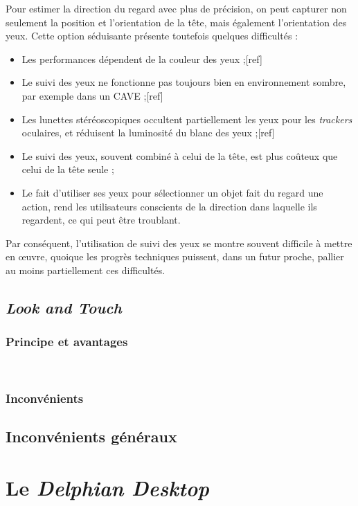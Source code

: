 	Pour estimer la direction du regard avec plus de précision, on peut capturer non seulement la position et l'orientation de la tête, mais également l'orientation des yeux. Cette option séduisante présente toutefois quelques difficultés :
	\begin{itemize}
		\item Les performances dépendent de la couleur des yeux ;[ref]
		\item Le suivi des yeux ne fonctionne pas toujours bien en environnement sombre, par exemple dans un CAVE ;[ref]
		\item Les lunettes stéréoscopiques occultent partiellement les yeux pour les \emph{trackers} oculaires, et réduisent la luminosité du blanc des yeux ;[ref]
		\item Le suivi des yeux, souvent combiné à celui de la tête, est plus coûteux que celui de la tête seule ;
		\item Le fait d'utiliser ses yeux pour sélectionner un objet fait du regard une action, rend les utilisateurs conscients de la direction dans laquelle ils regardent, ce qui peut être troublant.
	\end{itemize}

	Par conséquent, l'utilisation de suivi des yeux se montre souvent difficile à mettre en œuvre, quoique les progrès techniques puissent, dans un futur proche, pallier au moins partiellement ces difficultés.
	
	\subsection{\emph{Look and Touch}}
	\subsubsection{Principe et avantages}
	~\cite{stellmach2012look}
	
	\subsubsection{Inconvénients}
	
	\subsection{Inconvénients généraux}
	
\section{Le \emph{Delphian Desktop}}
